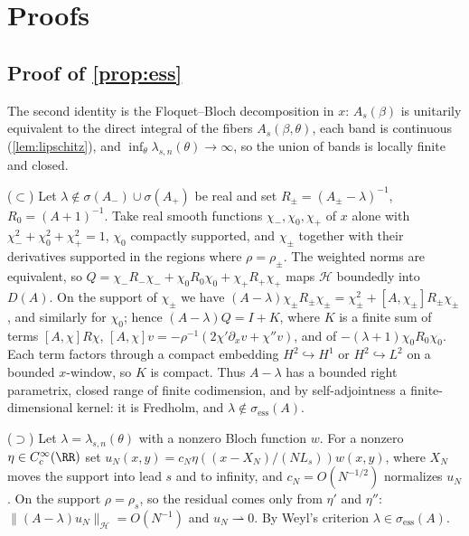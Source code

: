 \section{Proofs}\label{sm:proofs}

\subsection{Proof of \texorpdfstring{\cref{prop:ess}}{Proposition 2.1}}\label{sm:proof-ess}
The second identity is the Floquet--Bloch decomposition in $x$: $A_s(\beta)$ is
unitarily equivalent to the direct integral of the fibers $A_s(\beta,\theta)$,
each band is continuous (\cref{lem:lipschitz}), and
$\inf_\theta\lambda_{s,n}(\theta)\to\infty$, so the union of bands is locally
finite and closed.

($\subset$) Let $\lambda\notin\sigma(A_-)\cup\sigma(A_+)$ be real and set
$R_\pm=(A_\pm-\lambda)^{-1}$, $R_0=(A+1)^{-1}$. Take real smooth functions
$\chi_-,\chi_0,\chi_+$ of $x$ alone with $\chi_-^2+\chi_0^2+\chi_+^2=1$,
$\chi_0$ compactly supported, and $\chi_\pm$ together with their derivatives
supported in the regions where $\rho=\rho_\pm$. The weighted norms are
equivalent, so $Q=\chi_-R_-\chi_-+\chi_0R_0\chi_0+\chi_+R_+\chi_+$ maps
$\mathcal H$ boundedly into $D(A)$. On the support of $\chi_\pm$ we have
$(A-\lambda)\chi_\pm R_\pm\chi_\pm=\chi_\pm^2+[A,\chi_\pm]R_\pm\chi_\pm$, and
similarly for $\chi_0$; hence $(A-\lambda)Q=I+K$, where $K$ is a finite sum of
terms $[A,\chi]R\chi$, $[A,\chi]v=-\rho^{-1}(2\chi'\partial_xv+\chi''v)$, and of
$-(\lambda+1)\chi_0R_0\chi_0$. Each term factors through a compact embedding
$H^2\hookrightarrow H^1$ or $H^2\hookrightarrow L^2$ on a bounded $x$-window, so
$K$ is compact. Thus $A-\lambda$ has a bounded right parametrix, closed range of
finite codimension, and by self-adjointness a finite-dimensional kernel: it is
Fredholm, and $\lambda\notin\sigma_{\mathrm{ess}}(A)$.

($\supset$) Let $\lambda=\lambda_{s,n}(\theta)$ with a nonzero Bloch function
$w$. For a nonzero $\eta\in C_c^\infty(\RR)$ set
$u_N(x,y)=c_N\eta((x-X_N)/(NL_s))w(x,y)$, where $X_N$ moves the support into
lead $s$ and to infinity, and $c_N=O(N^{-1/2})$ normalizes $u_N$. On the
support $\rho=\rho_s$, so the residual comes only from $\eta'$ and $\eta''$:
$\|(A-\lambda)u_N\|_{\mathcal H}=O(N^{-1})$ and $u_N\rightharpoonup0$. By Weyl's
criterion $\lambda\in\sigma_{\mathrm{ess}}(A)$.

